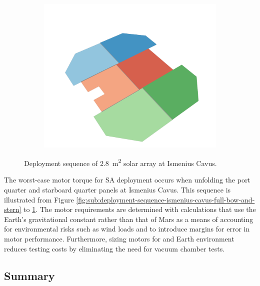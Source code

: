 \begin{figure}[h]
\begin{subfigure}[t]{\subfigureWidth}
		\label{fig:sub:deployment-sequence-ismenius-cavus-mid-quarter}
	\end{subfigure}\hspace*{2.5cm}
    \begin{subfigure}[t]{\subfigureWidth}
        \centering
		\includegraphics[height=\graphicsHeight]{sections/design/solar-array/images/deployment/ismenius-cavus/solar_array_deployment_ismenius_cavus_130.png}
		\label{fig:sub:deployment-sequence-ismenius-cavus-completed}
	\end{subfigure}
	\caption{Deployment sequence of \SI{2.8}{\meter\squared} solar array at Ismenius Cavus.}
	\label{fig:deployment-sequence-ismenius-cavus}
\vspace{-2ex}
\end{figure}

\clearpage
The worst-case motor torque for \ac{SA} deployment occurs when unfolding the port quarter and starboard quarter panels at Ismenius Cavus. This sequence is illustrated from Figure \ref{fig:sub:deployment-sequence-ismenius-cavus-full-bow-and-stern} to \ref{fig:sub:deployment-sequence-ismenius-cavus-mid-quarter}. The motor requirements are determined with calculations that use the Earth's gravitational constant rather than that of Mars as a means of accounting for environmental risks such as wind loads and to introduce margins for error in motor performance. Furthermore, sizing motors for and Earth environment reduces testing costs by eliminating the need for vacuum chamber tests.

\subsection{Summary}
